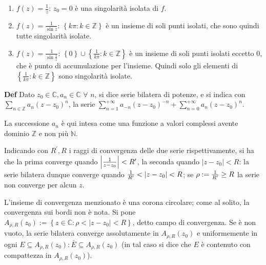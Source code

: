 \documentclass{article}
\begin{document}
\begin{enumerate}
\item $f\left( z\right) =\frac{1}{z}$: $z_{0}=0$ \`{e} una singolarit\`{a}
isolata di $f$.

\item $f\left( z\right) =\frac{1}{\sin z}$: $\left\{ k\pi :k\in 
\mathbb{Z}
\right\} $ \`{e} un insieme di soli punti isolati, che sono quindi tutte
singolarit\`{a} isolate.

\item $f\left( z\right) =\frac{1}{\sin \frac{1}{z}}$: $\left\{ 0\right\}
\cup \left\{ \frac{1}{k\pi }:k\in 
\mathbb{Z}
\right\} $ \`{e} un insieme di soli punti isolati eccetto $0$, che \`{e}
punto di accumulazione per l'insieme. Quindi solo gli elementi di $\left\{ 
\frac{1}{k\pi }:k\in 
\mathbb{Z}
\right\} $ sono singolarit\`{a} isolate.
\end{enumerate}

\textbf{Def} Dato $z_{0}\in 
\mathbb{C}
,a_{n}\in 
\mathbb{C}
$ $\forall $ $n$, si dice serie bilatera di potenze, e si indica con $%
\sum_{n\in 
\mathbb{Z}
}a_{n}\left( z-z_{0}\right) ^{n}$, la serie $\sum_{n=1}^{+\infty
}a_{-n}\left( z-z_{0}\right) ^{-n}+\sum_{n=0}^{+\infty }a_{n}\left(
z-z_{0}\right) ^{n}$.

La successione $a_{n}$ \`{e} qui intesa come una funzione a valori complessi
avente dominio $%
\mathbb{Z}
$ e non pi\`{u} $%
\mathbb{N}
$.

Indicando con $R^{\prime },R$ i raggi di convergenza delle due serie
rispettivamente, si ha che la prima converge quando $\left\vert \frac{1}{%
z-z_{0}}\right\vert <R^{\prime }$, la seconda quando $\left\vert
z-z_{0}\right\vert <R$: la serie bilatera dunque converge quando $\frac{1}{%
R^{\prime }}<\left\vert z-z_{0}\right\vert <R$; se $\rho :=\frac{1}{%
R^{\prime }}\geq R$ la serie non converge per alcun $z$.

L'insieme di convergenza menzionato \`{e} una corona circolare; come al
solito, la convergenza sui bordi non \`{e} nota. Si pone $A_{\rho ,R}\left(
z_{0}\right) :=\left\{ z\in 
\mathbb{C}
:\rho <\left\vert z-z_{0}\right\vert <R\right\} $, detto campo di
convergenza. Se \`{e} non vuoto, la serie bilatera converge assolutamente in 
$A_{\rho ,R}\left( z_{0}\right) $ e uniformemente in ogni $E\subseteq
A_{\rho ,R}\left( z_{0}\right) :\bar{E}\subseteq A_{\rho ,R}\left(
z_{0}\right) $ (in tal caso si dice che $E$ \`{e} contenuto con compattezza
in $A_{\rho ,R}\left( z_{0}\right) $).
\end{document}
